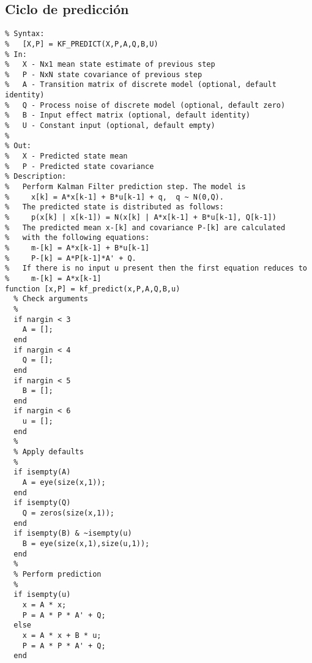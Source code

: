 \subsection{Ciclo de predicción}
\lstset{language=Matlab, breaklines=true, basicstyle=\footnotesize}
\lstset{numbers=left, numberstyle=\tiny, stepnumber=1, numbersep=-2pt}
\begin{lstlisting}[frame=single]
 %KF_PREDICT  Perform Kalman Filter prediction step
% Syntax:
%   [X,P] = KF_PREDICT(X,P,A,Q,B,U)
% In:
%   X - Nx1 mean state estimate of previous step
%   P - NxN state covariance of previous step
%   A - Transition matrix of discrete model (optional, default identity)
%   Q - Process noise of discrete model (optional, default zero)
%   B - Input effect matrix (optional, default identity)
%   U - Constant input (optional, default empty)
%
% Out:
%   X - Predicted state mean
%   P - Predicted state covariance
% Description:
%   Perform Kalman Filter prediction step. The model is
%     x[k] = A*x[k-1] + B*u[k-1] + q,  q ~ N(0,Q).
%   The predicted state is distributed as follows:
%     p(x[k] | x[k-1]) = N(x[k] | A*x[k-1] + B*u[k-1], Q[k-1])
%   The predicted mean x-[k] and covariance P-[k] are calculated
%   with the following equations:
%     m-[k] = A*x[k-1] + B*u[k-1]
%     P-[k] = A*P[k-1]*A' + Q.
%   If there is no input u present then the first equation reduces to
%     m-[k] = A*x[k-1]
function [x,P] = kf_predict(x,P,A,Q,B,u)
  % Check arguments
  %
  if nargin < 3
    A = [];
  end
  if nargin < 4
    Q = [];
  end
  if nargin < 5
    B = [];
  end
  if nargin < 6
    u = [];
  end  
  %
  % Apply defaults
  %
  if isempty(A)
    A = eye(size(x,1));
  end
  if isempty(Q)
    Q = zeros(size(x,1));
  end
  if isempty(B) & ~isempty(u)
    B = eye(size(x,1),size(u,1));
  end
  %
  % Perform prediction
  %
  if isempty(u)
    x = A * x;
    P = A * P * A' + Q;
  else
    x = A * x + B * u;
    P = A * P * A' + Q;
  end

\end{lstlisting}

